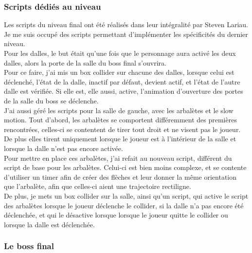 \documentclass[12pt]{article}
\begin{document}
\newpage

\subsubsection{Scripts dédiés au niveau}

Les scripts du niveau final ont été réalisés dans leur intégralité par Steven Lariau.\\
Je me suis occupé des scripts permettant d'implémenter les spécificités du dernier niveau.\\
Pour les dalles, le but était qu'une fois que le personnage aura activé les deux dalles, alors la porte de la salle du boss final s'ouvrira.\\
Pour ce faire, j'ai mis un \gls{box collider} sur chacune des dalles, lorsque celui est déclenché, l'état de la dalle, inactif par défaut, devient actif, et l'état de l'autre dalle est vérifiée. Si elle est, elle aussi, active, l'animation d'ouverture des portes de la salle du boss se déclenche.\\

J'ai aussi géré les scripts pour la salle de gauche, avec les arbalètes et le slow motion. Tout d'abord, les arbalètes se comportent différemment des premières rencontrées, celles-ci se contentent de tirer tout droit et ne visent pas le joueur. De plus elles tirent uniquement lorsque le joueur est à l'intérieur de la salle et lorsque la dalle n'est pas encore activée.\\
Pour mettre en place ces arbalètes, j'ai refait au nouveau script, différent du script de base pour les arbalètes. Celui-ci est bien moins complexe, et se contente d'utiliser un timer afin de créer des flèches et leur donner la même orientation que l'arbalète, afin que celles-ci aient une trajectoire rectiligne.\\
De plus, je mets un box collider sur la salle, ainsi qu'un script, qui active le script des arbalètes lorsque le joueur déclenche le collider, si la dalle n'a pas encore été déclenchée, et qui le désactive lorsque lorsque le joueur quitte le collider ou lorsque la dalle est déclenchée.

\newpage

\subsubsection{Le boss final}
\end{document}
